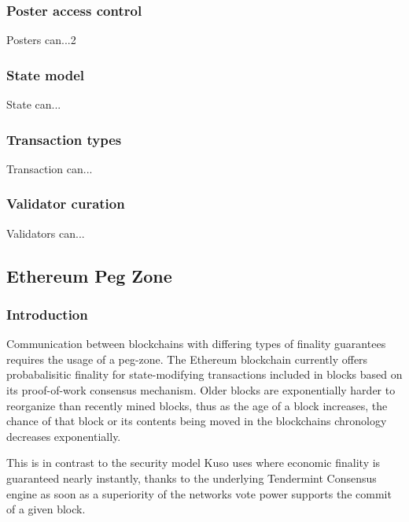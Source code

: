 \documentclass[10pt]{article}
\begin{document}
\subsubsection{Poster access control}\label{tm-network-access}
Posters can...2

\subsubsection{State model}\label{tm-network-state}
State can...

\subsubsection{Transaction types}\label{tm-network-tx-types}
Transaction can...

\subsubsection{Validator curation}\label{tm-network-validators}
Validators can...
\bigskip


\subsection{Ethereum Peg Zone}\label{peg}
\subsubsection{Introduction}\label{peg-intro}
Communication between blockchains with differing types of finality guarantees requires the usage of a peg-zone. The Ethereum blockchain currently offers probabalisitic finality for state-modifying transactions included in blocks based on its proof-of-work consensus mechanism. Older blocks are exponentially harder to reorganize than recently mined blocks, thus as the age of a block increases, the chance of that block or its contents being moved in the blockchains chronology decreases exponentially.
\medskip

This is in contrast to the security model Kuso uses where economic finality is guaranteed nearly instantly, thanks to the underlying Tendermint Consensus\cite{tendermint} engine  as soon as a superiority of the networks vote power supports the commit of a given block.
\medskip
\end{document}

